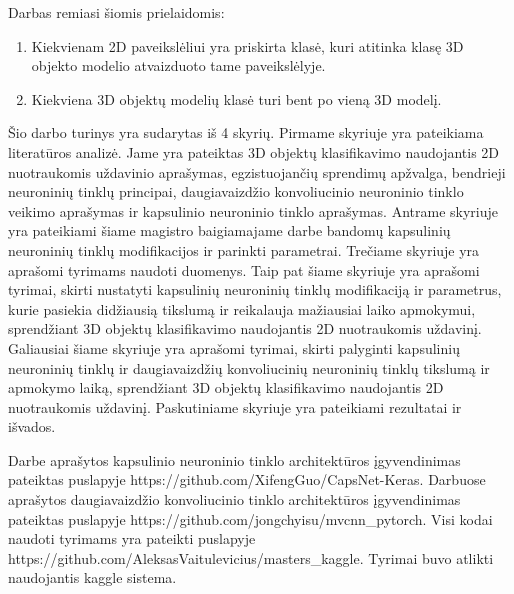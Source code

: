 Darbas remiasi šiomis prielaidomis:

\begin{enumerate}
	\item Kiekvienam 2D paveikslėliui yra priskirta klasė, kuri atitinka klasę 3D objekto modelio atvaizduoto tame paveikslėlyje.
	\item Kiekviena 3D objektų modelių klasė turi bent po vieną 3D modelį.
\end{enumerate}

Šio darbo turinys yra sudarytas iš 4 skyrių. Pirmame skyriuje yra pateikiama literatūros analizė. Jame yra pateiktas 3D objektų klasifikavimo naudojantis 2D nuotraukomis uždavinio aprašymas, egzistuojančių sprendimų apžvalga, bendrieji neuroninių tinklų principai, daugiavaizdžio konvoliucinio neuroninio tinklo veikimo aprašymas ir kapsulinio neuroninio tinklo aprašymas.
Antrame skyriuje yra pateikiami šiame magistro baigiamajame darbe bandomų kapsulinių neuroninių tinklų modifikacijos ir parinkti parametrai.
Trečiame skyriuje yra aprašomi tyrimams naudoti duomenys.
Taip pat šiame skyriuje yra aprašomi tyrimai, skirti nustatyti kapsulinių neuroninių tinklų modifikaciją ir parametrus, kurie pasiekia didžiausią tikslumą ir reikalauja mažiausiai laiko apmokymui, sprendžiant 3D objektų klasifikavimo naudojantis 2D nuotraukomis uždavinį.
Galiausiai šiame skyriuje yra aprašomi tyrimai, skirti palyginti kapsulinių neuroninių tinklų ir daugiavaizdžių konvoliucinių neuroninių tinklų tikslumą ir apmokymo laiką, sprendžiant 3D objektų klasifikavimo naudojantis 2D nuotraukomis uždavinį.
Paskutiniame skyriuje yra pateikiami rezultatai ir išvados.

Darbe \cite{capsNet} aprašytos kapsulinio neuroninio tinklo architektūros įgyvendinimas pateiktas puslapyje https://github.com/XifengGuo/CapsNet-Keras. Darbuose \cite{cnnExp1, cnnExp2} aprašytos daugiavaizdžio konvoliucinio tinklo architektūros įgyvendinimas pateiktas puslapyje https://github.com/jongchyisu/mvcnn\_pytorch. Visi kodai naudoti tyrimams yra pateikti puslapyje https://github.com/AleksasVaitulevicius/masters\_kaggle. Tyrimai buvo atlikti naudojantis kaggle sistema.
